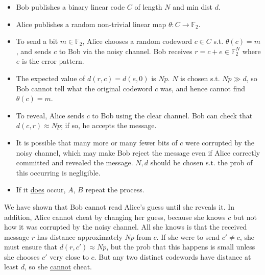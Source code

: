 \begin{itemize}
    \item Bob publishes a binary linear code $C$ of length $N$ and min dist $d$.
    \item Alice publishes a random non-trivial linear map $\theta \colon C \to \mathbb F_2$.
    \item To send a bit $m \in \mathbb F_2$, Alice chooses a random codeword $c \in C$ s.t. $\theta(c) = m$, and sends $c$ to Bob via the noisy channel. Bob receives $r = c + e \in \mathbb F_2^N$ where $e$ is the error pattern.
    \item The expected value of $d(r,c) = d(e,0)$ is $Np$. $N$ is chosen s.t. $Np \gg d$, so Bob cannot tell what the original codeword $c$ was, and hence cannot find $\theta(c) = m$.
    \item To reveal, Alice sends $c$ to Bob using the clear channel.
    Bob can check that $d(c,r) \approx Np$; if so, he accepts the message.
    \item It is possible that many more or many fewer bits of $c$ were corrupted by the noisy channel, which may make Bob reject the message even if Alice correctly committed and revealed the message.
    $N, d$ should be chosen s.t. the prob of this occurring is negligible.
    \item If it \underline{does} occur, $A$, $B$ repeat the process.
\end{itemize}

We have shown that Bob cannot read Alice's guess until she reveals it.
In addition, Alice cannot cheat by changing her guess, because she knows $c$ but not how it was corrupted by the noisy channel.
All she knows is that the received message $r$ has distance approximately $Np$ from $c$.
If she were to send $c' \neq c$, she must ensure that $d(r,c') \approx Np$, but the prob that this happens is small unless she chooses $c'$ very close to $c$.
But any two distinct codewords have distance at least $d$, so she \underline{cannot} cheat.

